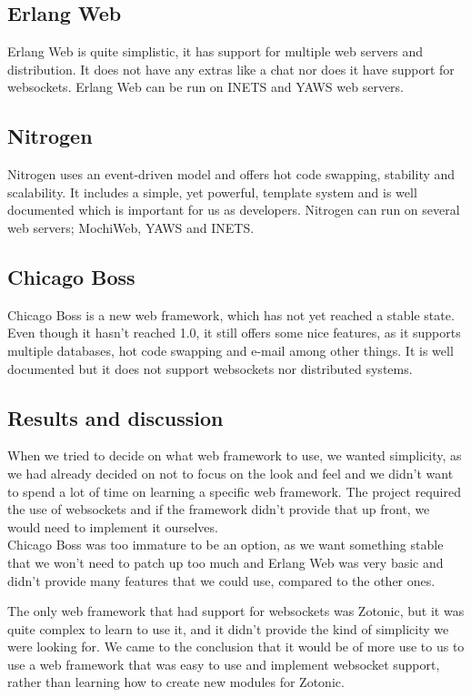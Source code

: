 \documentclass[11pt,a4paper]{report}
\begin{document}
\subsection{Erlang Web}
Erlang Web\cite{erlangweb} is quite simplistic, it has support for multiple web servers and
distribution. It does not have any extras like a chat nor does it have support
for websockets. Erlang Web can be run on INETS and YAWS web servers.

\subsection{Nitrogen}
Nitrogen\cite{nitrogen} uses an event-driven model and offers hot code swapping, stability
and scalability. It includes a simple, yet powerful, template system and is
well documented which is important for us as developers. Nitrogen can run on
several web servers; MochiWeb, YAWS and INETS.

\subsection{Chicago Boss}
Chicago Boss\cite{chicagoboss} is a new web framework, which has not yet reached
a stable state. Even though it hasn't reached 1.0, it still offers some nice
features, as it supports multiple databases, hot code swapping and e-mail among
other things. It is well documented but it does not support websockets nor
distributed systems.

\subsection{Results and discussion}
When we tried to decide on what web framework to use, we wanted simplicity, as
we had already decided on not to focus on the look and feel and we didn't want
to spend a lot of time on learning a specific web framework.
The project required the use of websockets and if the framework didn't
provide that up front, we would need to implement it ourselves.\\

Chicago Boss was too immature to be an option, as we want something stable that
we won't need to patch up too much and Erlang Web was very basic and didn't
provide many features that we could use, compared to the other ones.

The only web framework that had support for websockets was Zotonic, but it was
quite complex to learn to use it, and it didn't provide the kind of simplicity
we were looking for. We came to the conclusion that it would be of more use to
us to use a web framework that was easy to use and implement websocket support,
rather than learning how to create new modules for Zotonic.\\
\end{document}
